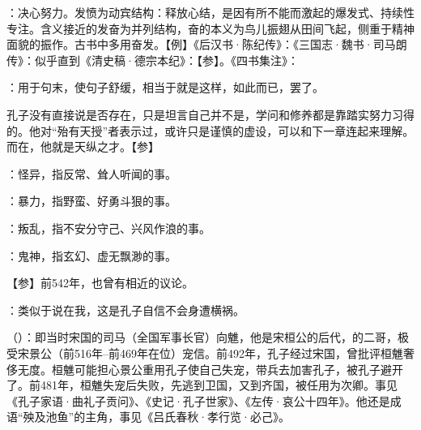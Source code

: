 {
\item {}：决心努力。发愤为动宾结构：释放心结，是因有所不能而激起的爆发式、持续性专注。含义接近的发奋为并列结构，奋的本义为鸟儿振翅从田间飞起，侧重于精神面貌的振作。古书中多用奋发。【例】《后汉书·陈纪传》：《三国志·魏书·司马朗传》：似乎直到《清史稿·德宗本纪》：【参】。《四书集注》：
\item {}：用于句末，使句子舒缓，相当于就是这样，如此而已，罢了。
}
{}


{
\item 孔子没有直接说是否存在，只是坦言自己并不是，学问和修养都是靠踏实努力习得的。他对“殆有天授”者表示过，或许只是谨慎的虚设，可以和下一章连起来理解。而在，他就是天纵之才。【参】 
}
{}


{
\item {}：怪异，指反常、耸人听闻的事。
\item {}：暴力，指野蛮、好勇斗狠的事。
\item {}：叛乱，指不安分守己、兴风作浪的事。
\item {}：鬼神，指玄幻、虚无飘渺的事。
}
{}


{
【参】前542年，也曾有相近的议论。
}
{}


{
\item {}：类似于说在我，这是孔子自信不会身遭横祸。

\item {}（）：即当时宋国的司马（全国军事长官）向魋，他是宋桓公的后代，的二哥，极受宋景公（前516年--前469年在位）宠信。前492年，孔子经过宋国，曾批评桓魋奢侈无度。桓魋可能担心景公重用孔子使自己失宠，带兵去加害孔子，被孔子避开了。前481年，桓魋失宠后失败，先逃到卫国，又到齐国，被任用为次卿。事见《孔子家语·曲礼子贡问》、《史记·孔子世家》、《左传·哀公十四年》。他还是成语“殃及池鱼”的主角，事见《吕氏春秋·孝行览·必己》。%
}
{}


